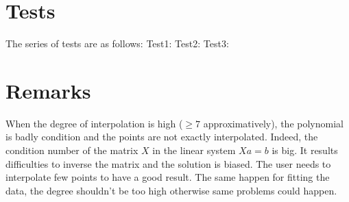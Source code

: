 \documentclass[12pt]{article}
\begin{document}
\section{Tests}
The series of tests are as follows:
Test1:
Test2:
Test3:


\section{Remarks}
When the degree of interpolation is high ($\ge 7$ approximatively), the polynomial is badly condition and the points are not exactly interpolated. Indeed, the condition number of the matrix $X$ in the linear system $Xa=b$ is big. It results difficulties to inverse the matrix and the solution is biased. The user needs to interpolate few points to have a good result.
The same happen for fitting the data, the degree shouldn't be too high otherwise same problems could happen.



 
\end{document}
